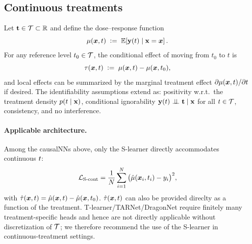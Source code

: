 \subsection{Continuous treatments}
\label{app:continuous}
Let ${\mathbf{t}} \in \mathcal{T}\subset\mathbb{R}$ and define the dose–response function
\begin{equation}
\label{eq:dose-response}
\mu({\bm{x}},t)\;\vcentcolon=\;\operatorname{\mathbb{E}}\!\left[{\mathbf{y}}(t)\mid {\mathbf{x}}={\bm{x}}\right].
\end{equation}
For any reference level $t_0\in\mathcal{T}$, the conditional effect of moving from $t_0$ to $t$ is
\begin{equation}
\label{eq:CATE-cont}
\tau({\bm{x}},t)\;\vcentcolon=\;\mu({\bm{x}},t)-\mu({\bm{x}},t_0),
\end{equation}
and local effects can be summarized by the marginal treatment effect $\partial \mu({\bm{x}},t)/\partial t$ if desired. The identifiability assumptions extend as: positivity w.r.t.\ the treatment density $p(t\mid {\mathbf{x}})$, conditional ignorability $\outcome(t)\,\indep\,\giventhat{\treatment}{\covariates}$ for all $t\in\mathcal{T}$, consistency, and no interference.

\paragraph{Applicable architecture.}
Among the causalNNs above, only the S-learner directly accommodates continuous $t$:
\begin{equation}
\label{eq:S-cont}
\mathcal{L}_{\text{S-cont}}=\frac{1}{N}\sum_{i=1}^{N}\big(\hat{\mu}({\bm{x}}_i,t_i)-y_i\big)^2,
\end{equation}
with $\hat{\tau}({\bm{x}},t)=\hat{\mu}({\bm{x}},t)-\hat{\mu}({\bm{x}},t_0)$. $\hat{\tau}({\bm{x}},t)$ can also be provided direclty as a function of the treatment. T-learner/TARNet/DragonNet require finitely many treatment-specific heads and hence are not directly applicable without discretization of $\mathcal{T}$; we therefore recommend the use of the S-learner in continuous-treatment settings.